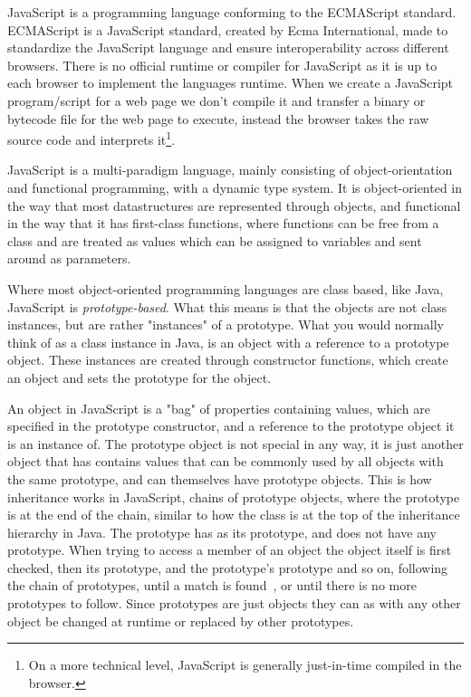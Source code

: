 JavaScript is a programming language conforming to the ECMAScript standard.
ECMAScript is a JavaScript standard, created by Ecma International, made to standardize the JavaScript language and ensure interoperability across different browsers.
There is no official runtime or compiler for JavaScript as it is up to each browser to implement the languages runtime.
When we create a JavaScript program/script for a web page we don't compile it and transfer a binary or bytecode file for the web page to execute, instead the browser takes the raw source code and interprets it\footnote{On a more technical level, JavaScript is generally just-in-time compiled in the browser.}.

JavaScript is a multi-paradigm language, mainly consisting of object-orientation and functional programming, with a dynamic type system.
It is object-oriented in the way that most datastructures are represented through objects, and functional in the way that it has first-class functions, where functions can be free from a class and are treated as values which can be assigned to variables and sent around as parameters.

Where most object-oriented programming languages are class based, like Java, JavaScript is \textit{prototype-based}.
What this means is that the objects are not class instances, but are rather "instances" of a prototype.
What you would normally think of as a class instance in Java, is an object with a reference to a prototype object.
These instances are created through constructor functions, which create an object and sets the prototype for the object.

An object in JavaScript is a "bag" of properties containing values, which are specified in the prototype constructor, and a reference to the prototype object it is an instance of.
The prototype object is not special in any way, it is just another object that has contains values that can be commonly used by all objects with the same prototype, and can themselves have prototype objects.
This is how inheritance works in JavaScript, chains of prototype objects, where the  prototype is at the end of the chain, similar to how the  class is at the top of the inheritance hierarchy in Java.
The  prototype has  as its prototype, and  does not have any prototype.
When trying to access a member of an object the object itself is first checked, then its prototype, and the prototype's prototype and so on, following the chain of prototypes, until a match is found~\cite{prototypechaining}, or until there is no more prototypes to follow.
Since prototypes are just objects they can as with any other object be changed at runtime or replaced by other prototypes.

